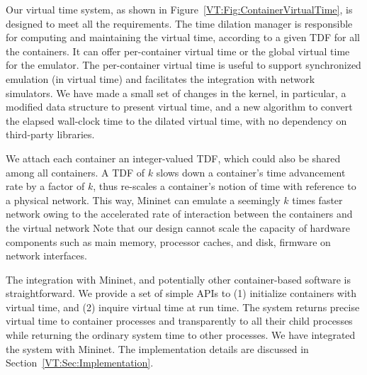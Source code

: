 \begin{figure*}
    \centering
    \caption[Virtual Time System Design]{Architecture of the Virtual Time System in a Container-based Network Emulator.
    Note that a typical container-based network emulator can be presented by this figure without the Virtual Time Middleware.}
    \label{VT:Fig:ContainerVirtualTime}
\end{figure*}

Our virtual time system, as shown in Figure~\ref{VT:Fig:ContainerVirtualTime}, is designed to meet all the requirements. 
The time dilation manager is responsible for computing and maintaining the virtual time, according to a given TDF for all the containers. 
It can offer per-container virtual time or the global virtual time for the emulator.
The per-container virtual time is useful to support synchronized emulation (in virtual time) and facilitates the integration with network simulators. 
We have made a small set of changes in the kernel, in particular, a modified data structure to present virtual time,
and a new algorithm to convert the elapsed wall-clock time to the dilated virtual time, with no dependency on third-party libraries.

We attach each container an integer-valued TDF, which could also be shared among all containers. 
A TDF of $k$ slows down a container's time advancement rate by a factor of $k$, thus re-scales a container's notion of time with reference to a physical network. 
This way, Mininet can emulate a seemingly $k$ times faster network owing to the accelerated rate of interaction between the containers and the virtual network
Note that our design cannot scale the capacity of hardware components such as main memory, processor caches, and disk, firmware on network interfaces. 

The integration with Mininet, and potentially other container-based software is straightforward. 
We provide a set of simple APIs to (1) initialize containers with virtual time, and (2) inquire virtual time at run time. 
The system returns precise virtual time to container processes and transparently to all their child processes while returning the ordinary system time to other processes. 
We have integrated the system with Mininet. The implementation details are discussed in Section~\ref{VT:Sec:Implementation}.

